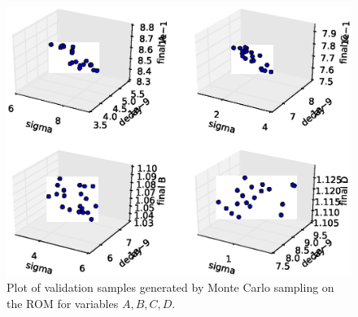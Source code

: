  \begin{figure}[h!]
  \centering
  \includegraphics[scale=0.7]{../../tests/framework/user_guide/ForwardSamplingStrategies/gold/RunDir/SparseGrid/1-samplesROMPlot3D_scatter-scatter-scatter-scatter.eps}
  \caption{Plot of validation samples generated by Monte Carlo sampling on the ROM for variables $A,B,C,D$.}
  \label{fig:samplesROMSparseGridPlot}
 \end{figure}








